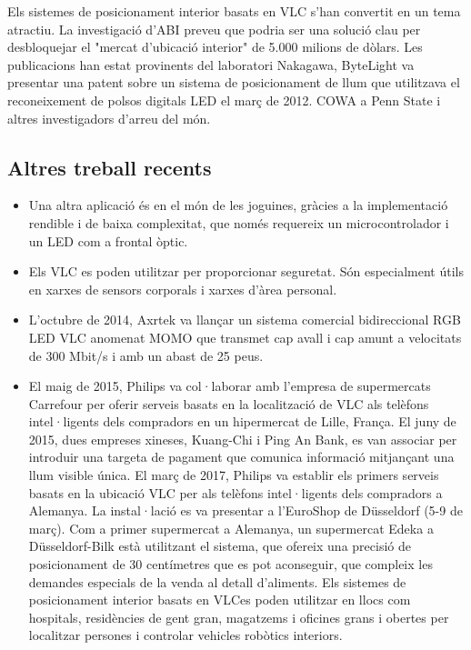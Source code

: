 Els sistemes de posicionament interior basats en VLC s'han convertit en un tema atractiu. La investigació d'ABI preveu que podria ser una solució clau per desbloquejar el "mercat d'ubicació interior" de 5.000 milions de dòlars. Les publicacions han estat provinents del laboratori Nakagawa, ByteLight va presentar una patent sobre un sistema de posicionament de llum que utilitzava el reconeixement de polsos digitals LED el març de 2012. COWA a Penn State i altres investigadors d'arreu del món.


\subsection*{Altres treball recents}


\begin{itemize}
    \item Una altra aplicació és en el món de les joguines, gràcies a la implementació rendible i de baixa complexitat, que només requereix un microcontrolador i un LED com a frontal òptic.
    \item Els VLC es poden utilitzar per proporcionar seguretat. Són especialment útils en xarxes de sensors corporals i xarxes d'àrea personal.
    \item L'octubre de 2014, Axrtek va llançar un sistema comercial bidireccional RGB LED VLC anomenat MOMO que transmet cap avall i cap amunt a velocitats de 300 Mbit/s i amb un abast de 25 peus.
    \item El maig de 2015, Philips va col·laborar amb l'empresa de supermercats Carrefour per oferir serveis basats en la localització de VLC als telèfons intel·ligents dels compradors en un hipermercat de Lille, França. El juny de 2015, dues empreses xineses, Kuang-Chi i Ping An Bank, es van associar per introduir una targeta de pagament que comunica informació mitjançant una llum visible única. El març de 2017, Philips va establir els primers serveis basats en la ubicació VLC per als telèfons intel·ligents dels compradors a Alemanya. La instal·lació es va presentar a l'EuroShop de Düsseldorf (5-9 de març). Com a primer supermercat a Alemanya, un supermercat Edeka a Düsseldorf-Bilk està utilitzant el sistema, que ofereix una precisió de posicionament de 30 centímetres que es pot aconseguir, que compleix les demandes especials de la venda al detall d'aliments. Els sistemes de posicionament interior basats en VLCes poden utilitzar en llocs com hospitals, residències de gent gran, magatzems i oficines grans i obertes per localitzar persones i controlar vehicles robòtics interiors.
\end{itemize}